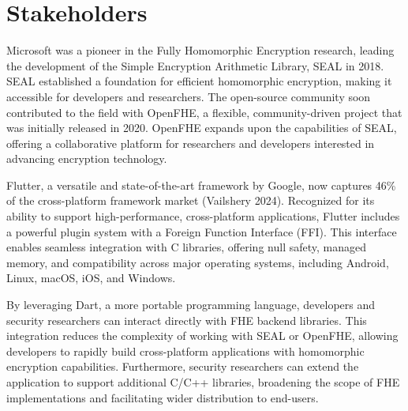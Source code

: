 \section{Stakeholders}
Microsoft was a pioneer in the Fully Homomorphic Encryption research, leading the development of the Simple Encryption Arithmetic Library, SEAL in 2018. SEAL established a foundation for efficient homomorphic encryption, making it accessible for developers and researchers. The open-source community soon contributed to the field with OpenFHE, a flexible, community-driven project that was initially released in 2020. OpenFHE expands upon the capabilities of SEAL, offering a collaborative platform for researchers and developers interested in advancing encryption technology.

Flutter, a versatile and state-of-the-art framework by Google, now captures 46\% of the cross-platform framework market (Vailshery 2024). Recognized for its ability to support high-performance, cross-platform applications, Flutter includes a powerful plugin system with a Foreign Function Interface (FFI). This interface enables seamless integration with C libraries, offering null safety, managed memory, and compatibility across major operating systems, including Android, Linux, macOS, iOS, and Windows.

By leveraging Dart, a more portable programming language, developers and security researchers can interact directly with FHE backend libraries. This integration reduces the complexity of working with SEAL or OpenFHE, allowing developers to rapidly build cross-platform applications with homomorphic encryption capabilities. Furthermore, security researchers can extend the application to support additional C/C++ libraries, broadening the scope of FHE implementations and facilitating wider distribution to end-users.

